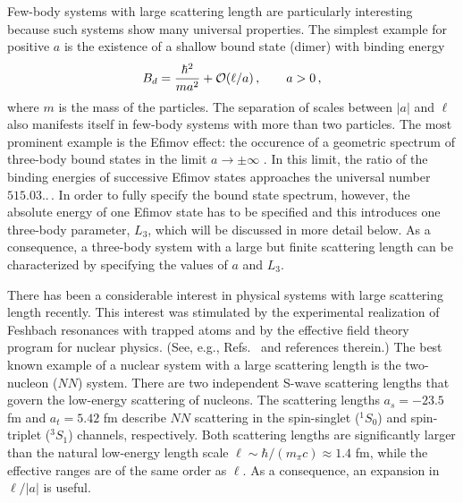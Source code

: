 \documentclass[prc,preprint,tightenlines,showpacs]{revtex4}
\newcommand{\beq}{\begin{equation}}
\newcommand{\eeq}{\end{equation}}
\begin{document}
Few-body systems with large scattering length are particularly
interesting because such systems show many universal properties. 
The simplest example for positive $a$
is the existence of a shallow bound state (dimer) with binding energy
\beq
B_d=\frac{\hbar^2}{ma^2}+ {\cal O}(\ell/a)\,, \qquad a>0\,,
\label{B2-eq}
\eeq
where $m$ is the mass of the particles.
The separation of scales between $|a|$ and $\ell$ also manifests itself
in few-body systems with more than two particles. The most prominent
example is the Efimov effect: the occurence of a geometric spectrum of 
three-body bound states in the limit $a\to \pm\infty$ 
\cite{Efimov71}. In this limit, the ratio of the binding energies of
successive Efimov states approaches the universal number 
$515.03..\,$. In order to fully specify the bound state spectrum,
however, the absolute energy of one Efimov state has to be specified
and this introduces one three-body parameter, $L_3$, which 
will be discussed in more detail below. As a consequence,
a three-body system with a large but finite scattering length can be 
characterized by specifying the values of $a$ and $L_3$.


There has been a considerable interest in physical systems with 
large scattering length recently. 
This interest was stimulated by the experimental realization of 
Feshbach resonances with trapped atoms and by the effective 
field theory program for nuclear physics. (See, e.g., 
Refs.~\cite{Braaten:2004rn,Bedaque:2002mn} and references therein.)
The best known example of a nuclear system with a large scattering
length is the two-nucleon ($NN$) system. There are two independent S-wave
scattering lengths that govern the low-energy scattering 
of nucleons. The scattering lengths 
$a_s= -23.5$ fm and $a_t= 5.42$ fm describe $NN$ scattering in the 
spin-singlet ($^1S_0$) and spin-triplet ($^3S_1$) channels, respectively.
Both scattering lengths are significantly larger than the natural
low-energy length scale $\ell\sim\hbar/(m_\pi c)\approx 1.4$ fm, while
the effective ranges are of the same order as $\ell$.
As a consequence, an expansion in $\ell/|a|$ is useful. 
\end{document}
